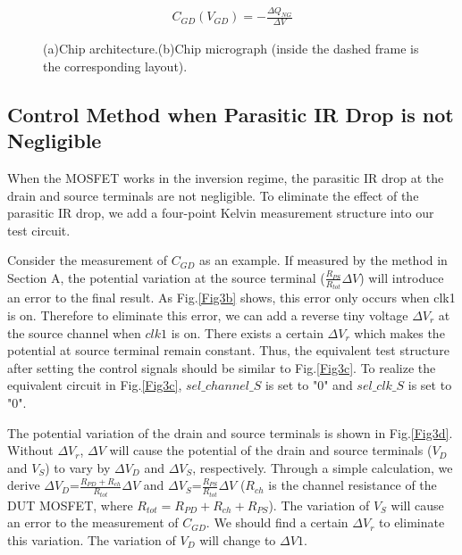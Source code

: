 \documentclass[journal]{IEEEtran}
\begin{document}
\begin{align}
  C_{GD}(V_{GD})=-\frac{\Delta Q_{NG}}{\Delta V}
\end{align}


\begin{figure*}
\centering
{}


\caption{(a)Chip architecture.(b)Chip micrograph (inside the dashed frame is the corresponding layout).}
\label{Fig4}
\end{figure*}






\subsection{Control Method when Parasitic IR Drop is not Negligible}
When the MOSFET works in the inversion regime, the parasitic IR drop at the drain and source terminals are not negligible. To eliminate the effect of the parasitic IR drop, we add a four-point Kelvin measurement structure into our test circuit.

Consider the measurement of $C_{GD}$ as an example. If measured by the method in Section A, the potential variation at the source terminal ($\frac{R_{PS}}{R_{tot}} \Delta V$) will introduce an error to the final result. As Fig.\ref{Fig3b} shows, this error only occurs when clk1 is on. Therefore to eliminate this error, we can add a reverse tiny voltage $\Delta V_{r}$ at the source channel when $clk1$ is on. There exists a certain $\Delta V_{r}$ which makes the potential at source terminal remain constant. Thus, the equivalent test structure after setting the control signals should be similar to Fig.\ref{Fig3c}. To realize the equivalent circuit in Fig.\ref{Fig3c}, $sel\_channel\_S$ is set to "0" and $sel\_clk\_S$ is set to "0".

The potential variation of the drain and source terminals is shown in Fig.\ref{Fig3d}. Without $\Delta V_{r}$, $\Delta V$ will cause the potential of the drain and source terminals ($V_{D}$ and $V_{S}$) to vary by $\Delta V_{D}$ and $\Delta V_{S}$, respectively. Through a simple calculation, we derive $\Delta V_{D}$=$\frac{R_{PD}+R_{ch}}{R_{tot}} \Delta V$ and $\Delta V_{S}$=$\frac{R_{PS}}{R_{tot}} \Delta V$ ($R_{ch}$ is the channel resistance of the DUT MOSFET, where $R_{tot}=R_{PD}+R_{ch}+R_{PS}$). The variation of $V_{S}$ will cause an error to the measurement of $C_{GD}$. We should find a certain $\Delta V_{r}$ to eliminate this variation. The variation of $V_{D}$ will change to $\Delta V{1}$. 
\end{document}
